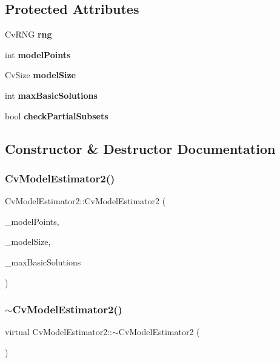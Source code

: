 \subsection*{Protected Attributes}
\begin{DoxyCompactItemize}
\item 
Cv\+R\+NG \textbf{ rng}
\item 
int \textbf{ model\+Points}
\item 
Cv\+Size \textbf{ model\+Size}
\item 
int \textbf{ max\+Basic\+Solutions}
\item 
bool \textbf{ check\+Partial\+Subsets}
\end{DoxyCompactItemize}


\subsection{Constructor \& Destructor Documentation}
\mbox{\label{class_cv_model_estimator2_a91cf072d79537808e705a9fa31867da3}} 
\subsubsection{Cv\+Model\+Estimator2()}
{\footnotesize\ttfamily Cv\+Model\+Estimator2\+::\+Cv\+Model\+Estimator2 (\begin{DoxyParamCaption}\item[{int}]{\+\_\+model\+Points,  }\item[{Cv\+Size}]{\+\_\+model\+Size,  }\item[{int}]{\+\_\+max\+Basic\+Solutions }\end{DoxyParamCaption})}

\mbox{\label{class_cv_model_estimator2_a656e12f072058449ca45d785c0eaa02a}} 
\subsubsection{$\sim$\+Cv\+Model\+Estimator2()}
{\footnotesize\ttfamily virtual Cv\+Model\+Estimator2\+::$\sim$\+Cv\+Model\+Estimator2 (\begin{DoxyParamCaption}{ }\end{DoxyParamCaption})\hspace{0.3cm}{\ttfamily [virtual]}}



